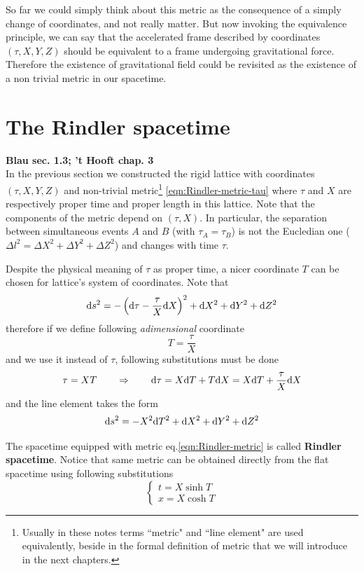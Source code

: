 \documentclass[../main/main.tex]{subfiles}
\begin{document}
So far we could simply think about this metric as the consequence of a simply change of coordinates, and not really matter. But now invoking the equivalence principle, we can say that the accelerated frame described by coordinates  $(\tau,X,Y,Z)$ should be equivalent to a frame undergoing gravitational force.
Therefore the existence of gravitational field could be revisited as the existence of a non trivial metric in our spacetime. 


\section{The Rindler spacetime}
\textbf{Blau sec. 1.3; 't Hooft chap. 3}\\

 In the previous section we constructed the rigid lattice with coordinates $(\tau,X,Y,Z)$ and non-trivial metric\footnote{Usually in these notes terms ``metric" and ``line element" are used equivalently, beside in the formal definition of metric that we will introduce in the next chapters.} \eqref{eqn:Rindler-metric-tau} where $\tau$ and $X$ are respectively proper time and proper length in this lattice. 
Note that the components of the metric depend on $(\tau,X)$. In particular, the separation between simultaneous events $A$ and $B$ (with $\tau_A=\tau_B$) is not the Eucledian one ($\Delta l^2=\Delta X^2+\Delta Y^2+\Delta Z^2$) and changes with time $\tau$.

Despite the physical meaning of $\tau$ as proper time, a nicer coordinate $T$ can be chosen for lattice's system of coordinates. Note that
\[\textup{d} s^2=-\left(\textup{d}\tau-\frac\tau X\textup{d} X\right)^2+\textup{d} X^2+\textup{d} Y^2+\textup{d} Z^2\]
therefore if we define following \emph{adimensional} coordinate
\[T=\frac\tau X\]
and we use it instead of $\tau$, following substitutions must be done
\[\tau=XT\qquad\Rightarrow\qquad\textup{d}\tau=X\textup{d} T+T\textup{d} X=X\textup{d} T+\frac\tau X\textup{d} X\]
 and the line element takes the form
\begin{equation}\label{eqn:Rindler-metric}
\textup{d} s^2=-X^2\textup{d} T^2+\textup{d} X^2+\textup{d} Y^2+\textup{d} Z^2
\end{equation}

The spacetime equipped with metric eq.\eqref{eqn:Rindler-metric} is called \textbf{Rindler spacetime}. 
Notice that same metric can be obtained directly from the flat spacetime using following substitutions
\[\begin{cases}
t=X\sinh T\\
x=X\cosh T
\end{cases}\]
\end{document}
